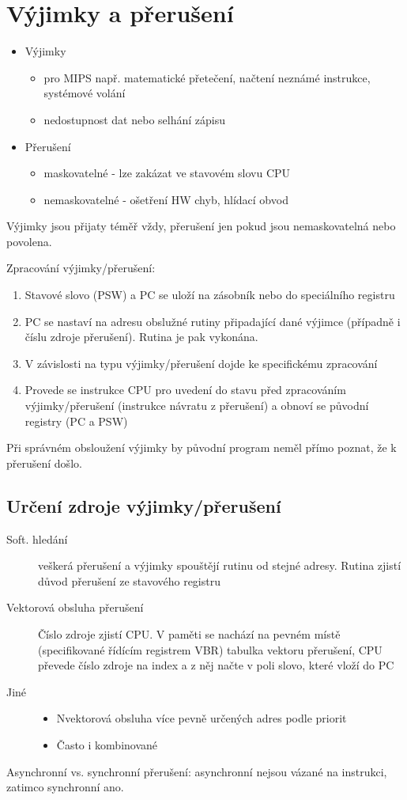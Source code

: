 \documentclass[10pt,a4paper,openright]{article}
\begin{document}
\section{Výjimky a přerušení}
\begin{itemize}
\item Výjimky
	\begin{itemize}
	\item pro MIPS např. matematické přetečení, načtení neznámé instrukce, systémové volání
	\item nedostupnost dat nebo selhání zápisu
	\end{itemize}
\item Přerušení
	\begin{itemize}
	\item maskovatelné - lze zakázat ve stavovém slovu CPU
	\item nemaskovatelné - ošetření HW chyb, hlídací obvod
	\end{itemize}
\end{itemize}

Výjimky jsou přijaty téměř vždy, přerušení jen pokud jsou nemaskovatelná nebo povolena.

Zpracování výjimky/přerušení:
\begin{enumerate}
\item Stavové slovo (PSW) a PC se uloží na zásobník nebo do speciálního registru
\item PC se nastaví na adresu obslužné rutiny připadající dané výjimce (případně i číslu zdroje přerušení). Rutina je pak vykonána.
\item V závislosti na typu výjimky/přerušení dojde ke specifickému zpracování
\item Provede se instrukce CPU pro uvedení do stavu před zpracováním výjimky/přerušení (instrukce návratu z přerušení) a obnoví se původní registry (PC a PSW)
\end{enumerate}

Při správném obsloužení výjimky by původní program neměl přímo poznat, že k přerušení došlo.

\subsection{Určení zdroje výjimky/přerušení}
\begin{description}
\item[Soft. hledání] veškerá přerušení a výjimky spouštějí rutinu od stejné adresy. Rutina zjistí důvod přerušení ze stavového registru
\item[Vektorová obsluha přerušení] Číslo zdroje zjistí CPU. V paměti se nachází na pevném místě (specifikované řídícím registrem VBR) tabulka vektoru přerušení, CPU převede číslo zdroje na index a z něj načte v poli slovo, které vloží do PC
\item[Jiné]
	\begin{itemize}
	\item Nvektorová obsluha více pevně určených adres podle priorit
	\item Často i kombinované
	\end{itemize}
\end{description}

Asynchronní vs. synchronní přerušení: asynchronní nejsou vázané na instrukci, zatimco synchronní ano.
\end{document}
